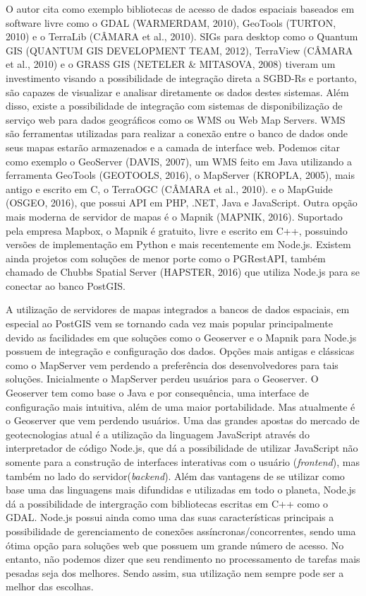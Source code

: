 		O autor cita como exemplo bibliotecas de acesso de dados espaciais baseados em software livre como o GDAL (WARMERDAM, 2010), GeoTools (TURTON, 2010) e o TerraLib (CÂMARA et al., 2010). SIGs para desktop como o Quantum GIS (QUANTUM GIS DEVELOPMENT TEAM, 2012), TerraView (CÂMARA et al., 2010) e o GRASS GIS (NETELER \& MITASOVA, 2008) tiveram um investimento visando a possibilidade de integração direta a SGBD-Rs e portanto, são capazes de visualizar e analisar diretamente os dados destes sistemas. Além disso, existe a possibilidade de integração com sistemas de disponibilização de serviço web para dados geográficos como os WMS ou Web Map Servers. WMS são ferramentas utilizadas para realizar a conexão entre o banco de dados onde seus mapas estarão armazenados e a camada de interface web. Podemos citar como exemplo o GeoServer (DAVIS, 2007), um WMS feito em Java utilizando a ferramenta GeoTools (GEOTOOLS, 2016), o MapServer (KROPLA, 2005), mais antigo e escrito em C, o TerraOGC (CÂMARA et al., 2010). e o MapGuide (OSGEO, 2016), que possui API em PHP, .NET, Java e JavaScript. Outra opção mais moderna de servidor de mapas é o Mapnik (MAPNIK, 2016). Suportado pela empresa Mapbox, o Mapnik é gratuito, livre e escrito em C++, possuindo versões de implementação em Python e mais recentemente em Node.js. Existem ainda projetos com soluções de menor porte como o PGRestAPI, também chamado de Chubbs Spatial Server (HAPSTER, 2016) que utiliza Node.js para se conectar ao banco PostGIS.
		
		A utilização de servidores de mapas integrados a bancos de dados espaciais, em especial ao PostGIS vem se tornando cada vez mais popular principalmente devido as facilidades em que soluções como o Geoserver e o Mapnik para Node.js possuem de integração e configuração dos dados. Opções mais antigas e clássicas como o MapServer vem perdendo a preferência dos desenvolvedores para tais soluções. Inicialmente o MapServer perdeu usuários para o Geoserver. O Geoserver tem como base o Java e por consequência, uma interface de configuração mais intuitiva, além de uma maior portabilidade. Mas atualmente é o Geoserver que vem perdendo usuários. Uma das grandes apostas do mercado de geotecnologias atual é a utilização da linguagem JavaScript através do interpretador de código Node.js, que dá a possibilidade de utilizar JavaScript não somente para a construção de interfaces interativas com o usuário (\textit{frontend}), mas também no lado do servidor(\textit{backend}). Além das vantagens de se utilizar como base uma das linguagens mais difundidas e utilizadas em todo o planeta, Node.js dá a possibilidade de intergração com bibliotecas escritas em C++ como o GDAL. Node.js possui ainda como uma das suas características principais a possibilidade de gerenciamento de conexões assíncronas/concorrentes, sendo uma ótima opção para soluções web que possuem um grande número de acesso. No entanto, não podemos dizer que seu rendimento no processamento de tarefas mais pesadas seja dos melhores. Sendo assim, sua utilização nem sempre pode ser a melhor das escolhas.
		
